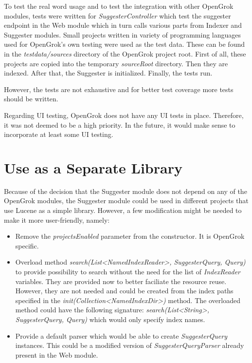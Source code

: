 To test the real word usage and to test the integration with other OpenGrok modules,
tests were written for \textit{SuggesterController} which test the
suggester endpoint in the Web module which in turn calls various parts from Indexer and Suggester modules.
Small projects written in variety of programming languages used for OpenGrok's own testing were used as the test data.
These can be found in the \textit{testdata/sources} directory of the OpenGrok project root.
First of all, these projects are copied into the temporary \textit{sourceRoot} directory. Then they are indexed.
After that, the Suggester is initialized. Finally, the tests run.

However, the tests are not exhaustive and for better test coverage more tests should be written.

Regarding UI testing, OpenGrok does not have any UI tests in place. Therefore, it was not deemed to be a high priority.
In the future, it would make sense to incorporate at least some UI testing.

\section{Use as a Separate Library}
Because of the decision that the Suggester module does not depend on any of the OpenGrok modules, the Suggester module
could be used in different projects that use Lucene as a simple library.
However, a few modification might be needed to make it more user-friendly,
namely:
\begin{itemize}
    \item Remove the \textit{projectsEnabled} parameter from the constructor. It is OpenGrok specific.
    \item Overload method \textit{search(List\textless NamedIndexReader\textgreater, SuggesterQuery, Query)} to provide
    possibility to search without the need for the list of \textit{IndexReader} variables. They are provided now to better
    faciliate the resource reuse. However, they are not needed and could be created from the index paths specified in
    the \textit{init(Collection\textless NamedIndexDir\textgreater)} method. The overloaded method could have the following signature:
    \textit{search(List\textless String\textgreater, SuggesterQuery, Query)} which would only specify index names.
    \item Provide a default parser which would be able to create \textit{SuggesterQuery} instances. This could be a
    modified version of \textit{SuggesterQueryParser} already present in the Web module.
\end{itemize}
